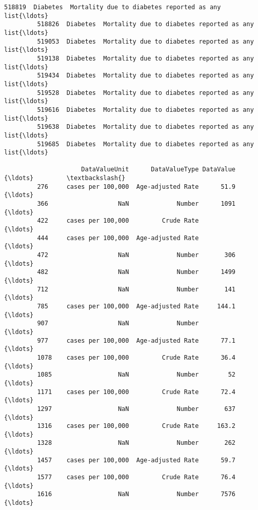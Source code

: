 \documentclass[11pt]{article}
\begin{document}
\begin{Verbatim}[commandchars=\\\{\}]
         518819  Diabetes  Mortality due to diabetes reported as any list{\ldots}   
         518826  Diabetes  Mortality due to diabetes reported as any list{\ldots}   
         519053  Diabetes  Mortality due to diabetes reported as any list{\ldots}   
         519138  Diabetes  Mortality due to diabetes reported as any list{\ldots}   
         519434  Diabetes  Mortality due to diabetes reported as any list{\ldots}   
         519528  Diabetes  Mortality due to diabetes reported as any list{\ldots}   
         519616  Diabetes  Mortality due to diabetes reported as any list{\ldots}   
         519638  Diabetes  Mortality due to diabetes reported as any list{\ldots}   
         519685  Diabetes  Mortality due to diabetes reported as any list{\ldots}   
         
                     DataValueUnit      DataValueType DataValue        {\ldots}         \textbackslash{}
         276     cases per 100,000  Age-adjusted Rate      51.9        {\ldots}          
         366                   NaN             Number      1091        {\ldots}          
         422     cases per 100,000         Crude Rate                  {\ldots}          
         444     cases per 100,000  Age-adjusted Rate                  {\ldots}          
         472                   NaN             Number       306        {\ldots}          
         482                   NaN             Number      1499        {\ldots}          
         712                   NaN             Number       141        {\ldots}          
         785     cases per 100,000  Age-adjusted Rate     144.1        {\ldots}          
         907                   NaN             Number                  {\ldots}          
         977     cases per 100,000  Age-adjusted Rate      77.1        {\ldots}          
         1078    cases per 100,000         Crude Rate      36.4        {\ldots}          
         1085                  NaN             Number        52        {\ldots}          
         1171    cases per 100,000         Crude Rate      72.4        {\ldots}          
         1297                  NaN             Number       637        {\ldots}          
         1316    cases per 100,000         Crude Rate     163.2        {\ldots}          
         1328                  NaN             Number       262        {\ldots}          
         1457    cases per 100,000  Age-adjusted Rate      59.7        {\ldots}          
         1577    cases per 100,000         Crude Rate      76.4        {\ldots}          
         1616                  NaN             Number      7576        {\ldots}          

\end{Verbatim}
\end{document}
